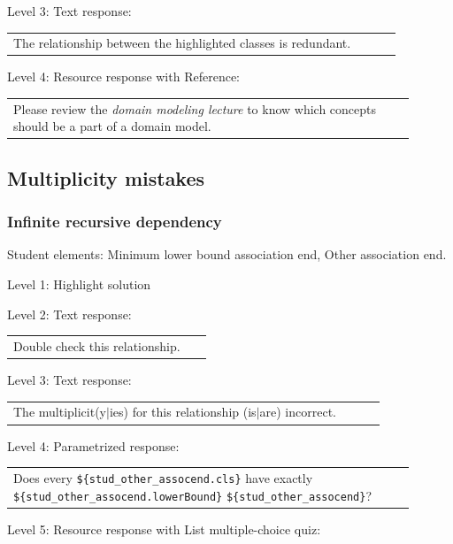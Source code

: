 \noindent Level 3: Text response: \medskip

\begin{tabular}{|p{0.9\linewidth}}
The relationship between the highlighted classes is redundant.
\end{tabular} \medskip

\noindent Level 4: Resource response with Reference: \medskip

\begin{tabular}{|p{0.9\linewidth}}
Please review the \textit{domain modeling lecture} to know which concepts should be a part of a domain model.
\end{tabular} \medskip


\subsection{Multiplicity mistakes}

\subsubsection{Infinite recursive dependency}

Student elements: Minimum lower bound association end, Other association end.  \medskip

\noindent Level 1: Highlight solution  \medskip

\noindent Level 2: Text response: \medskip

\begin{tabular}{|p{0.9\linewidth}}
Double check this relationship.
\end{tabular} \medskip

\noindent Level 3: Text response: \medskip

\begin{tabular}{|p{0.9\linewidth}}
The multiplicit(y$|$ies) for this relationship (is$|$are) incorrect.
\end{tabular} \medskip

\noindent Level 4: Parametrized response: \medskip

\begin{tabular}{|p{0.9\linewidth}}
Does every \verb|${stud_other_assocend.cls}| have exactly \verb|${stud_other_assocend.lowerBound}| \verb|${stud_other_assocend}|?
\end{tabular} \medskip

\noindent Level 5: Resource response with List multiple-choice quiz: \medskip

